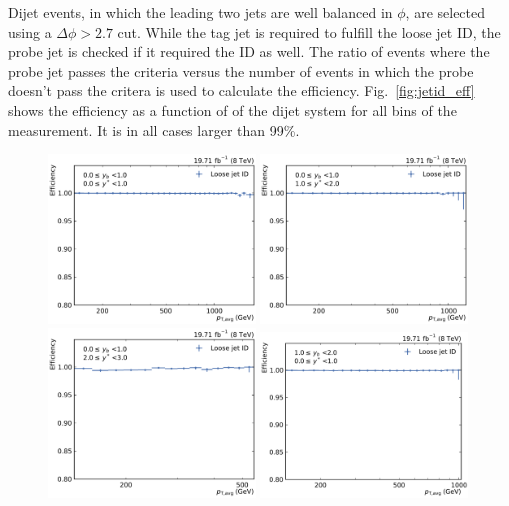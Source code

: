 Dijet events, in which the leading two jets are well balanced in $\phi$, are
selected using a $\Delta \phi > 2.7$ cut. While the tag jet is required to
fulfill the loose jet ID, the probe jet is checked if it required the ID as
well. The ratio of events where the probe
jet passes the criteria versus the number of events in which the probe doesn't
pass the critera is used to calculate the efficiency. Fig.~\ref{fig:jetid_eff}
shows the efficiency as a function of \ptavg of the dijet system for all bins of
the measurement. It is in all cases larger than 99\%.

\begin{figure}[htbp]
    \centering
    \includegraphics[width=0.49\textwidth]{figures/measurement/jetideff_yb0ys0.pdf}\hfill
    \includegraphics[width=0.49\textwidth]{figures/measurement/jetideff_yb0ys1.pdf}
    \includegraphics[width=0.49\textwidth]{figures/measurement/jetideff_yb0ys2.pdf}\hfill
    \includegraphics[width=0.49\textwidth]{figures/measurement/jetideff_yb1ys0.pdf}

\end{figure}
